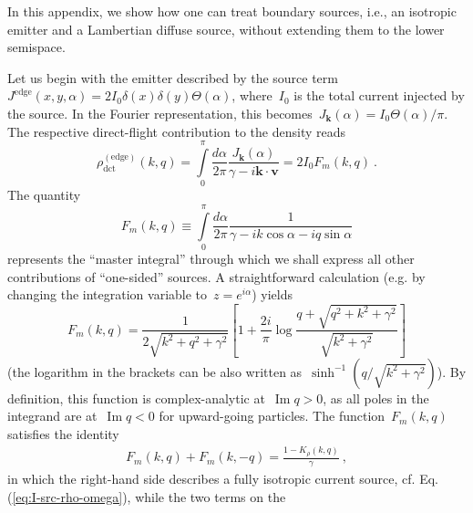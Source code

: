 \documentclass[preprint,aps,eqsecnum, prb]{revtex4-1}
\renewcommand{\Im}{\mathop{\mathrm{Im}}\nolimits}
\newcommand{\dct}[1]{{#1}_\mathrm{dct}}
\begin{document}

In this appendix, we show how one can treat boundary sources,
i.e., an isotropic emitter and a Lambertian diffuse source, without extending
them to the lower semispace.

Let us begin with the emitter described by the source term
$J^{\mathrm{edge}}(x, y, \alpha) = 2 I_0 \delta(x)\delta(y) \Theta(\alpha)$,
where~$I_0$ is the total current injected by the source. In the Fourier
representation, this becomes~$J_{\bm k}(\alpha) = I_0 \Theta(\alpha) / \pi$.
The respective direct-flight contribution to the density reads
\begin{equation}
   \label{eq:source-surf-rho-app}
  \dct{\rho}^{\mathrm{(edge)}}(k, q)
  = \int\limits_{0}^{\pi}
         \frac{d\alpha}{2\pi} \frac{J_{\bm k}(\alpha)}{\gamma
                               - i {\bm k} \cdot {\bm v}} = 2 I_0 F_m(k, q) \ .
\end{equation}
The quantity
\begin{equation}
F_m(k, q) \equiv \int\limits_{0}^{\pi}  \frac{d\alpha}{2\pi}
               \frac{1}{\gamma - i k \cos \alpha - i q \sin\alpha}
\end{equation}
represents the ``master integral'' through which we shall express
all other contributions of ``one-sided'' sources.
A straightforward calculation (e.g. by changing the
integration variable to~$z = e^{i\alpha}$) yields
\begin{equation}
  \label{eq:source-fm-def}
  F_m(k, q) = \frac{1}{2\sqrt{k^2 + q^2 + \gamma^2}}
  \left[1 + \frac{2i}{\pi}
               \log\frac{q + \sqrt{q^2 + k^2 + \gamma^2}}{\sqrt{k^2 + \gamma^2}}\right]
\end{equation}
(the logarithm in the brackets can be also written
as~$\sinh^{-1} (q / \sqrt{k^2 + \gamma^2})$). By definition, this function
is complex-analytic at~$\Im q > 0$, as all poles in the integrand are
at~$\Im q < 0$ for upward-going particles. The function~$F_m(k, q)$
satisfies the identity
\begin{align}
  \label{eq:fm-identity}
  F_m(k, q) + F_m(k, -q) = \frac{1 - K_\rho(k, q)}{\gamma} \ ,
\end{align}
in which the right-hand side describes a fully isotropic current source, 
cf. Eq.(\ref{eq:I-src-rho-omega}), while the two terms on the
\end{document}
